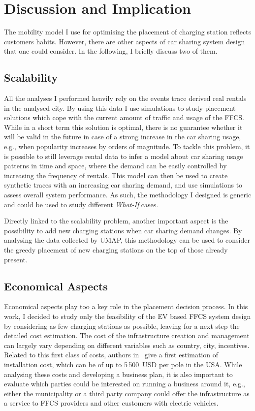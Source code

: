 \section{Discussion and Implication}
\label{sec:7_8_discussion}

The mobility model I use for optimising the placement of charging station reflects customers habits. However, there are other aspects of car sharing system design that one could consider. In the following, I briefly discuss two of them.

\subsection{Scalability}

All the analyses I performed heavily rely on the events trace derived real rentals in the analysed city. By using this data I use simulations to study placement solutions which cope with the current amount of traffic and usage of the FFCS. While in a short term this solution is optimal, there is no guarantee whether it will be valid in the future in case of a strong increase in the car sharing usage, e.g., when popularity increases by orders of magnitude. To tackle this problem, it is possible to still leverage rental data to infer a model about car sharing usage patterns in time and space, where the demand can be easily controlled by increasing the frequency of rentals. This model can then be used to create synthetic traces with an increasing car sharing demand, and use simulations to assess overall system performance. As such, the methodology I designed is generic and could be used to study different \textit{What-If} cases.

Directly linked to the scalability problem, another important aspect is the possibility to add new charging stations when car sharing demand changes. 
By analysing the data collected by UMAP, this methodology can be used to consider the greedy placement of new charging stations on the top of those already present.

\subsection{Economical Aspects}


Economical aspects play too a key role in the placement decision process. In this work, I decided to study only the feasibility of the EV based FFCS system design by considering as few charging stations as possible, leaving for a next step the detailed cost estimation. The cost of the infrastructure creation and management can largely vary depending on different variables such as country, city, incentives. 
Related to this first class of costs, authors in~\cite{USAInstallCost} give a first estimation of installation cost, which can be of up to 5\,500~USD per pole in the USA. 
While analysing these costs and developing a business plan, it is also important to evaluate which parties could be interested on running a business around it, e.g., either the municipality or a third party company could offer the infrastructure as a service to FFCS providers and other customers with electric vehicles.  

